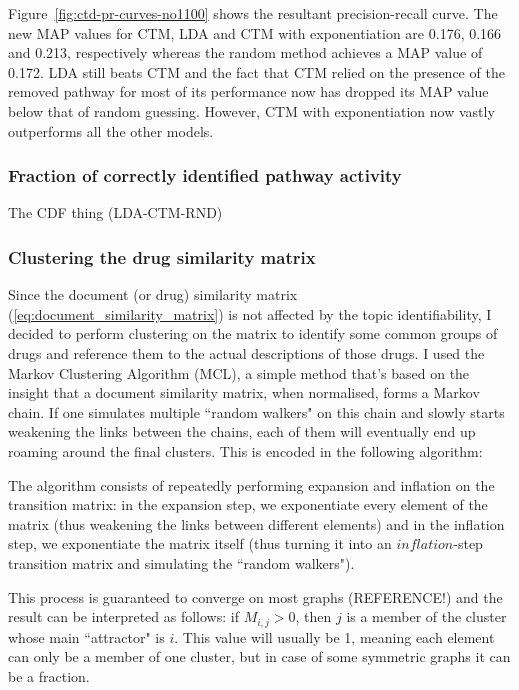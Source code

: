 \documentclass[12pt,a4paper,twoside,openright]{report}
\begin{document}
Figure~\ref{fig:ctd-pr-curves-no1100} shows the resultant precision-recall curve. The new MAP values for CTM, LDA and CTM with exponentiation are 0.176, 0.166 and 0.213, respectively whereas the random method achieves a MAP value of 0.172. LDA still beats CTM and the fact that CTM relied on the presence of the removed pathway for most of its performance now has dropped its MAP value below that of random guessing. However, CTM with exponentiation now vastly outperforms all the other models.

\subsubsection{Fraction of correctly identified pathway activity}
The CDF thing (LDA-CTM-RND)

\subsubsection{Clustering the drug similarity matrix}
Since the document (or drug) similarity matrix (\ref{eq:document_similarity_matrix}) is not affected by the topic identifiability, I decided to perform clustering on the matrix to identify some common groups of drugs and reference them to the actual descriptions of those drugs.
I used the Markov Clustering Algorithm (MCL), a simple method that's based on the insight that a document similarity matrix, when normalised, forms a Markov chain. If one simulates multiple ``random walkers" on this chain and slowly starts weakening the links between the chains, each of them will eventually end up roaming around the final clusters. This is encoded in the following algorithm:



The algorithm consists of repeatedly performing expansion and inflation on the transition matrix: in the expansion step, we exponentiate every element of the matrix (thus weakening the links between different elements) and in the inflation step, we exponentiate the matrix itself (thus turning it into an $\mathit{inflation}$-step transition matrix and simulating the ``random walkers").

This process is guaranteed to converge on most graphs (REFERENCE!) and the result can be interpreted as follows: if $M_{i,j} > 0$, then $j$ is a member of the cluster whose main ``attractor" is $i$. This value will usually be 1, meaning each element can only be a member of one cluster, but in case of some symmetric graphs it can be a fraction.
\end{document}

